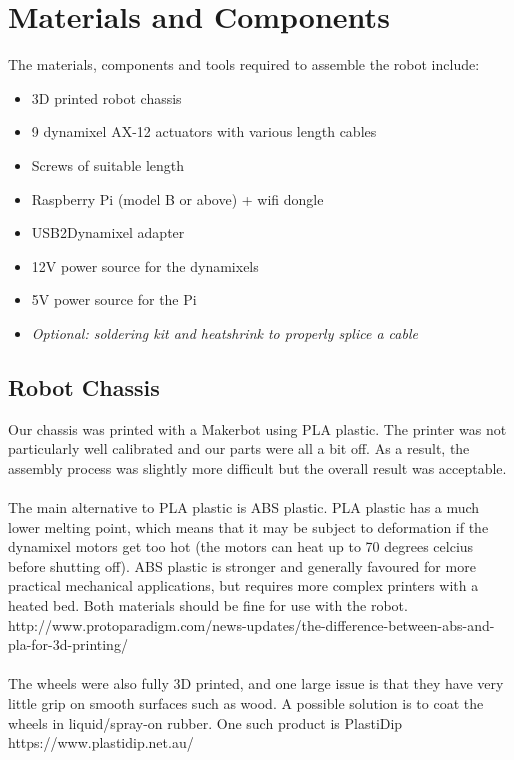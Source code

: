 \documentclass[]{article}
\begin{document}
\section{Materials and Components}
The materials, components and tools required to assemble the robot include:
\begin{itemize}
  \item 3D printed robot chassis
  \item 9 dynamixel AX-12 actuators with various length cables
  \item Screws of suitable length
  \item Raspberry Pi (model B or above) + wifi dongle
  \item USB2Dynamixel adapter
  \item 12V power source for the dynamixels
  \item 5V power source for the Pi
  \item \textit{Optional: soldering kit and heatshrink to properly splice a cable}
\end{itemize}
\subsection{Robot Chassis}
Our chassis was printed with a Makerbot using PLA plastic. The printer was not particularly well calibrated and our parts were all a bit off. As a result, the assembly process was slightly more difficult but the overall result was acceptable.
\\
\\
The main alternative to PLA plastic is ABS plastic. PLA plastic has a much lower melting point, which means that it may be subject to deformation if the dynamixel motors get too hot (the motors can heat up to 70 degrees celcius before shutting off). ABS plastic is stronger and generally favoured for more practical mechanical applications, but requires more complex printers with a heated bed. Both materials should be fine for use with the robot. http://www.protoparadigm.com/news-updates/the-difference-between-abs-and-pla-for-3d-printing/
\\
\\
The wheels were also fully 3D printed, and one large issue is that they have very little grip on smooth surfaces such as wood. A possible solution is to coat the wheels in liquid/spray-on rubber. One such product is PlastiDip https://www.plastidip.net.au/
\end{document}

